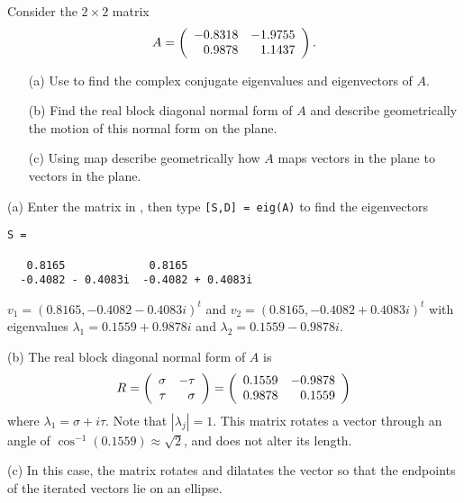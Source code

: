\documentclass{ximera}
\begin{document}
\begin{computerExercise} \label{c10.4.6}
Consider the $2\times 2$ matrix
\[
A = \left(\begin{array}{rr} -0.8318 & -1.9755\\ 0.9878 &1.1437\end{array}\right).
\]
\begin{itemize}
\item[(a)]  Use \Matlab to find the complex conjugate eigenvalues and 
eigenvectors of $A$.
\item[(b)]  Find the real block diagonal normal form of $A$ and describe
geometrically the motion of this normal form on the plane.
\item[(c)]  Using {\sf map} describe geometrically how $A$ maps vectors in 
the plane to vectors in the plane. 
\end{itemize}

\begin{solution}

(a) Enter the matrix in \Matlabp, then type {\tt [S,D] = eig(A)} to
find the eigenvectors 
\begin{verbatim}
S =
 
   0.8165             0.8165
  -0.4082 - 0.4083i  -0.4082 + 0.4083i
\end{verbatim}
$v_1 = (0.8165, -0.4082 - 0.4083i)^t$ and
$v_2 = (0.8165, -0.4082 + 0.4083i)^t$ with eigenvalues
$\lambda_1 = 0.1559 + 0.9878i$ and $\lambda_2 = 0.1559 - 0.9878i$.

(b) The real block diagonal normal form of $A$ is
\[
R = \left(\begin{array}{rr} \sigma & -\tau\\ \tau &\sigma\end{array}\right) = \left(\begin{array}{rr} 0.1559 & -0.9878\\ 0.9878 &0.1559\end{array}\right)
\]
where $\lambda_1 = \sigma + i\tau$.  Note that $|\lambda_j|=1$.  
This matrix rotates a vector through an angle of 
$\cos^{-1}(0.1559) \approx \sqrt{2}$, and does not alter its length.  


(c) In this case, the matrix rotates and dilatates the vector so that
the endpoints of the iterated vectors lie on an ellipse.

\end{solution}
\end{computerExercise}
\end{document}
